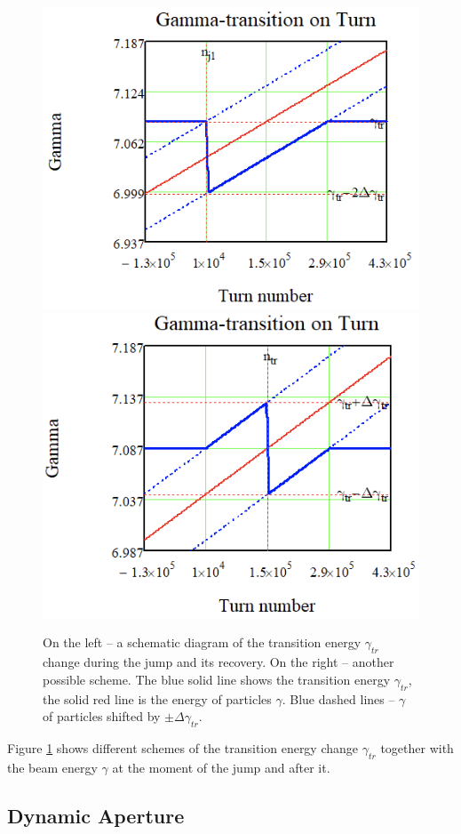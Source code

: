 \documentclass[a4paper]{jpconf}
\begin{document}
\begin{figure}[!htb]
   \centering
   \includegraphics*[width=.45\columnwidth]{img/WEPOPT004_f1-1}
   \includegraphics*[width=.45\columnwidth]{img/WEPOPT004_f1-2}
   \caption{On the left – a schematic diagram of the transition energy $\gamma_{tr}$ change during the jump and its recovery. On the right – another possible scheme. The blue solid line shows the transition energy $\gamma_{tr}$, the solid red line is the energy of particles $\gamma$. Blue dashed lines – $\gamma$ of particles shifted by $\pm\Delta\gamma_{tr}$.}
   \label{fig:jump_schemes}
\end{figure}

Figure \ref{fig:jump_schemes} shows different schemes of the transition energy change $\gamma_{tr}$ together with the beam energy $\gamma$ at the moment of the jump and after it.

\subsection{Dynamic Aperture}
\end{document}
